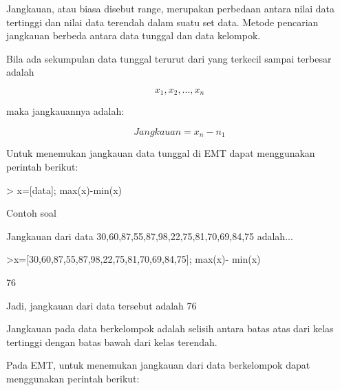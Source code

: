 \documentclass[a4paper,10pt]{article}
\begin{document}
\begin{eulernotebook}
\begin{eulercomment}
\begin{eulercomment}
\begin{eulercomment}
\begin{eulercomment}
\begin{eulercomment}
\begin{eulercomment}
\begin{eulercomment}
\begin{eulercomment}
\begin{eulercomment}
\begin{eulercomment}
\begin{eulercomment}
\end{eulercomment}
\begin{eulercomment}
Jangkauan, atau biasa disebut range, merupakan perbedaan antara nilai
data tertinggi dan nilai data terendah dalam suatu set data. Metode
pencarian jangkauan berbeda antara data tunggal dan data kelompok.

\end{eulercomment}
\begin{eulercomment}
Bila ada sekumpulan data tunggal terurut dari yang terkecil sampai
terbesar adalah

\end{eulercomment}
\begin{eulerformula}
\[
x_1, x_2,..., x_n
\]
\end{eulerformula}
\begin{eulercomment}
maka jangkauannya adalah:

\end{eulercomment}
\begin{eulerformula}
\[
Jangkauan = x_n-n_1
\]
\end{eulerformula}
\begin{eulercomment}
Untuk menemukan jangkauan data tunggal di EMT dapat menggunakan
perintah berikut:

\textgreater{} x=[data]; max(x)-min(x)

Contoh soal

Jangkauan dari data 30,60,87,55,87,98,22,75,81,70,69,84,75 adalah...
\end{eulercomment}
\begin{eulerprompt}
>x=[30,60,87,55,87,98,22,75,81,70,69,84,75]; max(x)- min(x)
\end{eulerprompt}
\begin{euleroutput}
  76
\end{euleroutput}
\begin{eulercomment}
Jadi, jangkauan dari data tersebut adalah 76

\end{eulercomment}
\begin{eulercomment}
Jangkauan pada data berkelompok adalah selisih antara batas atas dari
kelas tertinggi dengan batas bawah dari kelas terendah.

Pada EMT,  untuk menemukan jangkauan dari data berkelompok dapat
menggunakan perintah berikut:


\end{eulercomment}
\end{eulercomment}
\end{eulercomment}
\end{eulercomment}
\end{eulercomment}
\end{eulercomment}
\end{eulercomment}
\end{eulercomment}
\end{eulercomment}
\end{eulercomment}
\end{eulercomment}
\end{eulernotebook}
\end{document}
